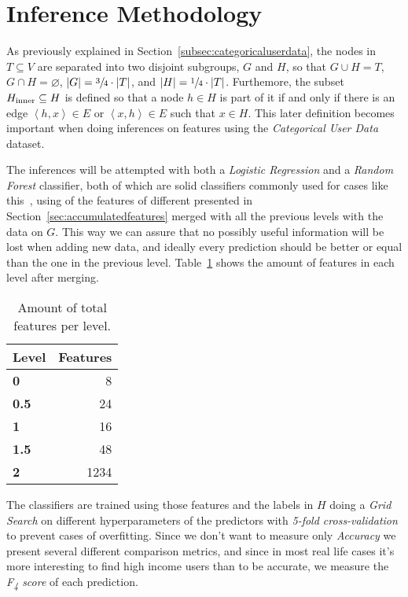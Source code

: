 \section{Inference Methodology}

As previously explained in Section~\ref{subsec:categoricaluserdata}, the nodes in $T \subseteq V$ are separated into two disjoint subgroups, $G$ and $H$, so that $G \cup H = T$, $G \cap H = \varnothing$, $\left| G \right| = \sfrac{3}{4} \cdot \left| T \right|$, and $\left| H \right| = \sfrac{1}{4} \cdot \left| T \right|$. Furthemore, the subset $H_{\operatorname{inner}} \subseteq H$ is defined so that a node $h \in H$ is part of it if and only if there is an edge $\left< h, x \right> \in E$ or $\left< x, h \right> \in E$ such that $x \in H$\footnotemark{}. This later definition becomes important when doing inferences on features using the \emph{Categorical User Data} dataset.


The inferences will be attempted with both a \emph{Logistic Regression} and a \emph{Random Forest} classifier, both of which are solid classifiers commonly used for cases like this~\cite{binaryevaluation}, using of the features of different presented in Section~\ref{sec:accumulatedfeatures} merged with all the previous levels with the data on $G$. This way we can assure that no possibly useful information will be lost when adding new data, and ideally every prediction should be better or equal than the one in the previous level. Table~\ref{tab:features} shows the amount of features in each level after merging.

\begin{table}[t]
\centering
\begin{tabular}{>{\bfseries}l r}
\toprule
Level & Features \\
\midrule
0 & \num{8} \\
0.5 & \num{24} \\
1 & \num{16} \\
1.5 & \num{48} \\
2 & \num{1234} \\
\bottomrule
\end{tabular}
\caption{Amount of total features per level.}
\label{tab:features}
\end{table}

The classifiers are trained using those features and the labels in $H$ doing a \emph{Grid Search} on different hyperparameters of the predictors with \emph{5-fold cross-validation} to prevent cases of overfitting. Since we don't want to measure only \emph{Accuracy} we present several different comparison metrics, and since in most real life cases it's more interesting to find high income users than to be accurate\footnotemark{}, we measure the \emph{F\textsubscript{4} score} of each prediction.

